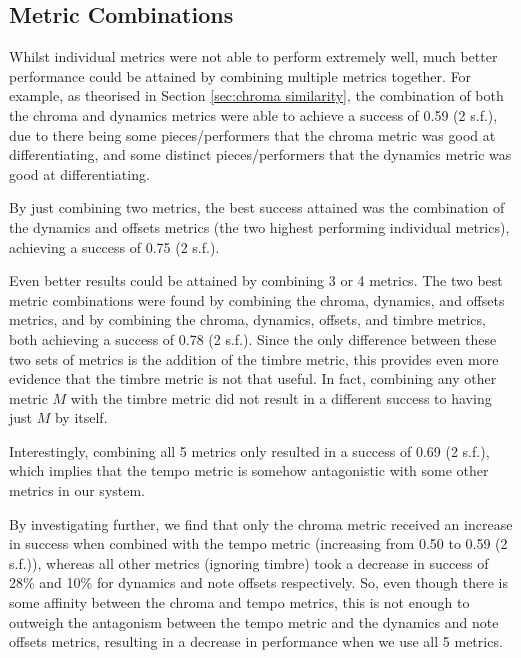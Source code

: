 \documentclass[oneside, class=book, 12pt, crop=false]{standalone}
\begin{document}

\subsection{Metric Combinations}

Whilst individual metrics were not able to perform extremely well, much better performance could be attained by combining multiple metrics together. For example, as theorised in Section \ref{sec:chroma similarity}, the combination of both the chroma and dynamics metrics were able to achieve a success of 0.59 (2 s.f.), due to there being some pieces/performers that the chroma metric was good at differentiating, and some distinct pieces/performers that the dynamics metric was good at differentiating.

By just combining two metrics, the best success attained was the combination of the dynamics and offsets metrics (the two highest performing individual metrics), achieving a success of 0.75 (2 s.f.).

Even better results could be attained by combining 3 or 4 metrics. The two best metric combinations were found by combining the chroma, dynamics, and offsets metrics, and by combining the chroma, dynamics, offsets, and timbre metrics, both achieving a success of 0.78 (2 s.f.). Since the only difference between these two sets of metrics is the addition of the timbre metric, this provides even more evidence that the timbre metric is not that useful. In fact, combining any other metric $M$ with the timbre metric did not result in a different success to having just $M$ by itself.

Interestingly, combining all 5 metrics only resulted in a success of 0.69 (2 s.f.), which implies that the tempo metric is somehow antagonistic with some other metrics in our system.

By investigating further, we find that only the chroma metric received an increase in success when combined with the tempo metric (increasing from 0.50 to 0.59 (2 s.f.)), whereas all other metrics (ignoring timbre) took a decrease in success of 28\% and 10\% for dynamics and note offsets respectively. So, even though there is some affinity between the chroma and tempo metrics, this is not enough to outweigh the antagonism between the tempo metric and the dynamics and note offsets metrics, resulting in a decrease in performance when we use all 5 metrics.
\end{document}
